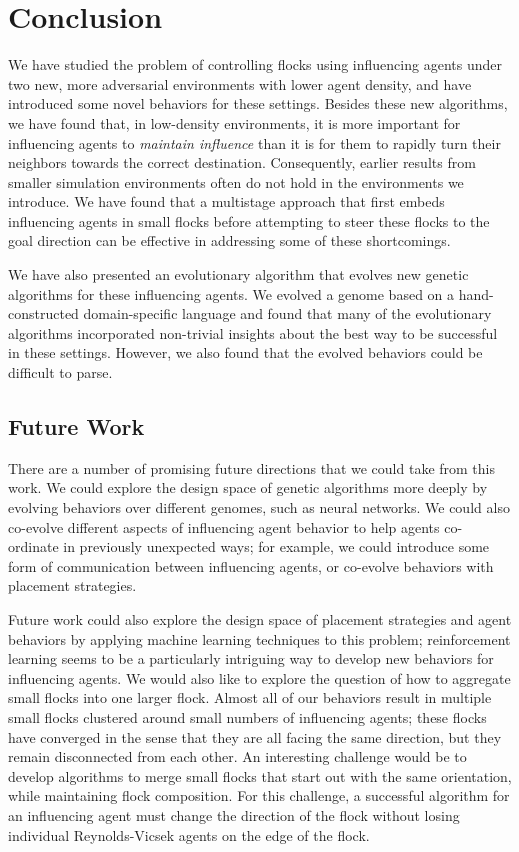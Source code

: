 \chapter{Conclusion}
\label{ch:conclusion}

We have studied the problem of controlling flocks using influencing agents
under two new, more adversarial environments with lower agent density, and
have introduced some novel behaviors for these settings.
Besides these new algorithms, we have found that, in low-density
environments, it is more important for influencing agents to
\textit{maintain influence} than it is for them to rapidly turn their
neighbors towards the correct destination.
Consequently, earlier results from smaller simulation environments often do
not hold in the environments we introduce.
We have found that a multistage approach that first embeds influencing
agents in small flocks before attempting to steer these flocks to the goal
direction can be effective in addressing some of these shortcomings.

We have also presented an evolutionary algorithm that evolves new genetic
algorithms for these influencing agents.
We evolved a genome based on a hand-constructed domain-specific language
and found that many of the evolutionary algorithms incorporated non-trivial
insights about the best way to be successful in these settings.
However, we also found that the evolved behaviors could be difficult to parse.

\section*{Future Work}
There are a number of promising future directions that we could take from this
work.
We could explore the design space of genetic algorithms more deeply by
evolving behaviors over different genomes, such as neural networks.
We could also co-evolve different aspects of influencing agent behavior to help
agents co-ordinate in previously unexpected ways; for example, we could
introduce some form of communication between influencing agents, or co-evolve
behaviors with placement strategies.

Future work could also explore the design space of placement strategies and
agent behaviors by applying machine learning techniques to this problem;
reinforcement learning seems to be a particularly intriguing way to develop new
behaviors for influencing agents.
We would also like to explore the question of how to aggregate small flocks
into one larger flock.
Almost all of our behaviors result in multiple small flocks clustered around
small numbers of influencing agents; these flocks have converged in the sense
that they are all facing the same direction, but they remain disconnected from
each other.
An interesting challenge would be to develop algorithms to merge small flocks
that start out with the same orientation, while maintaining flock composition.
For this challenge, a successful algorithm for an influencing agent must change
the direction of the flock without losing individual Reynolds-Vicsek agents on
the edge of the flock.

